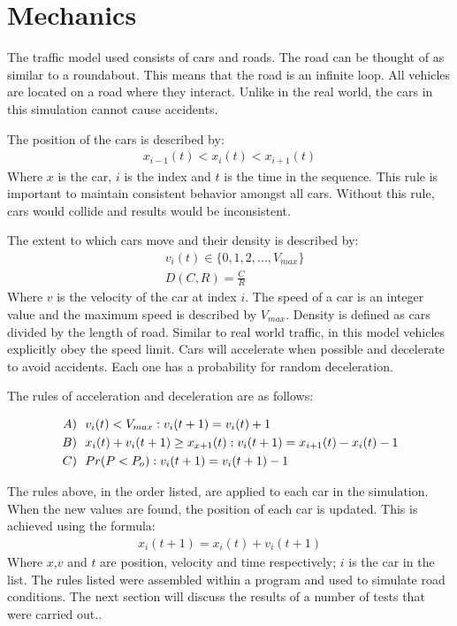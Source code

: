 \documentclass[12pt]{extarticle}
\begin{document}
\section{Mechanics}

The traffic model used consists of cars and roads. The road can be thought of as similar to a roundabout. This means that the road is an infinite loop. All vehicles are located on a road where they interact. Unlike in the real world, the cars in this simulation cannot cause accidents. 

The position of the cars is described by:
\begin{align}
\label{e1}
x_{i-1}(t) < x_{i}(t) < x_{i+1}(t)
\end{align}
Where $x$ is the car, $i$ is the index and $t$ is the time in the sequence. This rule is important to maintain consistent behavior amongst all cars. Without this rule, cars would collide and results would be inconsistent. 

The extent to which cars move and their density is described by:
\begin{align}
\label{e2}
& v_i(t) \in \{0,1,2, ..., V_{max}\} \\
\label{e3}
& D(C,R) = \frac{C}{R}
\end{align}
Where $v$ is the velocity of the car at index $i$. The speed of a car is an integer value and the maximum speed is described by $V_{max}$. Density is defined as cars divided by the length of road. Similar to real world traffic, in this model vehicles explicitly obey the speed limit. Cars will accelerate when possible and decelerate to avoid accidents. Each one has a probability for random deceleration. 

The rules of acceleration and deceleration are as follows:

\begin{align}
\notag A)& \ \ v_i(t) < V_{max} : v_i(t+1) = v_i(t) + 1\\ 
\notag B)& \ \  x_i(t) + v_i(t + 1) \geq x_{x+1}(t) : v_i(t + 1) =x_{i+1}(t) - x_i(t) - 1\\
\label{e4}
C)& \ \ Pr(P < P_{o}) :v_i(t+1) = v_i(t+1) - 1 
\end{align}

The rules above, in the order listed, are applied to each car in the simulation. When the new values are found, the position of each car is updated. This is achieved using the formula:
\begin{align}
\label{e5}
 x_i(t + 1) = x_i(t) + v_i(t+1)
\end{align}
Where $x$,$v$ and $t$ are position, velocity and time respectively; $i$ is the car in the list. The rules listed were assembled within a program and used to simulate road conditions. The next section will discuss the results of a number of tests that were carried out..
\end{document}
